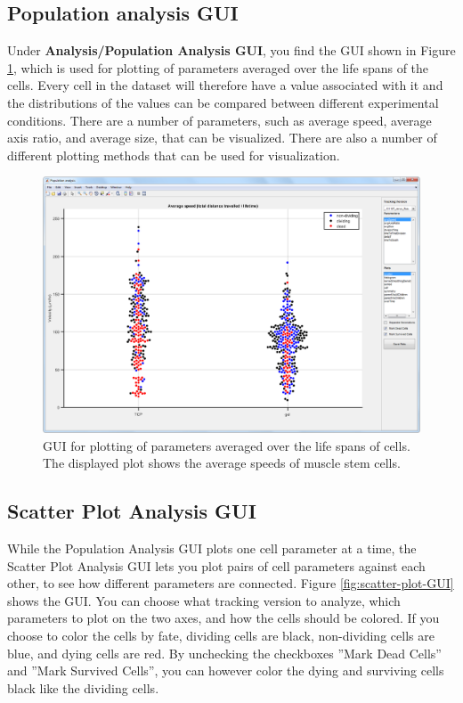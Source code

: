 \documentclass[a4paper, oneside, onecolumn, 11pt]{article}
\newcommand{\menu}[1]{\textbf{#1}}
\begin{document}
\subsection{Population analysis GUI}
Under \menu{Analysis/\allowbreak Population Analysis GUI}, you find the GUI shown in Figure \ref{fig:population-analysis-GUI}, which is used for plotting of parameters averaged over the life spans of the cells. Every cell in the dataset will therefore have a value associated with it and the distributions of the values can be compared between different experimental conditions. There are a number of parameters, such as average speed, average axis ratio, and average size, that can be visualized. There are also a number of different plotting methods that can be used for visualization.

\begin{figure}[!htb]
\begin{center}
\includegraphics[width = \columnwidth]{figures/populationAnalysisGUI}
\caption{GUI for plotting of parameters averaged over the life spans of cells. The displayed plot shows the average speeds of muscle stem cells.}
\label{fig:population-analysis-GUI}
\end{center}
\end{figure}

\subsection{Scatter Plot Analysis GUI}
While the Population Analysis GUI plots one cell parameter at a time, the Scatter Plot Analysis GUI lets you plot pairs of cell parameters against each other, to see how different parameters are connected. Figure \ref{fig:scatter-plot-GUI} shows the GUI. You can choose what tracking version to analyze, which parameters to plot on the two axes, and how the cells should be colored. If you choose to color the cells by fate, dividing cells are black, non-dividing cells are blue, and dying cells are red. By unchecking the checkboxes ''Mark Dead Cells'' and ''Mark Survived Cells'', you can however color the dying and surviving cells black like the dividing cells.
\end{document}

